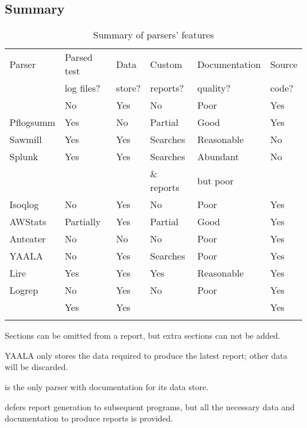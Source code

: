 \subsection{Summary}

\begin{table}[ht]
\begin{tabular}{llllll}
    Parser         & Parsed test & Data            & Custom        & Documentation  & Source \\
                   & log files?  & store?          & reports?      & quality?       & code?  \\
    \tableline{}
    \LMA{}         & No          & Yes             & No            & Poor           & Yes    \\ 
    Pflogsumm      & Yes         & No              & Partial\dag{} & Good           & Yes    \\
    Sawmill        & Yes         & Yes             & Searches      & Reasonable     & No     \\
    Splunk         & Yes         & Yes             & Searches      & Abundant       & No     \\
                   &             &                 & \& reports    & but poor       &        \\
    Isoqlog        & No          & Yes             & No            & Poor           & Yes    \\
    AWStats        & Partially   & Yes             & Partial\dag{} & Good           & Yes    \\
    Anteater       & No          & No              & No            & Poor           & Yes    \\
    YAALA          & No          & Yes\ddag{}      & Searches      & Poor           & Yes    \\
    Lire           & Yes         & Yes             & Yes           & Reasonable     & Yes    \\
    Logrep         & No          & Yes             & No            & Poor           & Yes    \\
    \parsername{}  & Yes         & Yes\nialpha{}   & \nibeta{}     &                & Yes    \\
    \tableline{}
\end{tabular}

\dag{} Sections can be omitted from a report, but extra sections can not be
added.

\ddag{} YAALA only stores the data required to produce the latest report;
other data will be discarded.

\nialpha{} \parsername{} is the only parser with documentation for its data
store.

\nibeta{} \parsername{} defers report generation to subsequent programs,
but all the necessary data and documentation to produce reports is
provided.

\caption{Summary of parsers' features}
\label{Summary of parsers' features}
\end{table}

